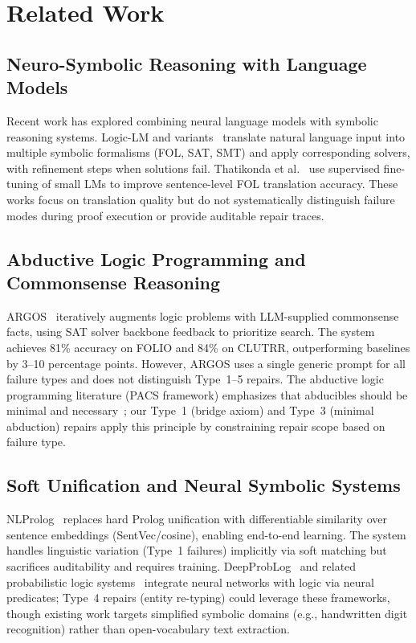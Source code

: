 \documentclass[11pt,letterpaper]{article}
\begin{document}
\section{Related Work}

\subsection{Neuro-Symbolic Reasoning with Language Models}

Recent work has explored combining neural language models with symbolic reasoning systems. Logic-LM and variants~\citep{Pan2023} translate natural language input into multiple symbolic formalisms (FOL, SAT, SMT) and apply corresponding solvers, with refinement steps when solutions fail. Thatikonda et al.~\citep{Thatikonda2026} use supervised fine-tuning of small LMs to improve sentence-level FOL translation accuracy. These works focus on translation quality but do not systematically distinguish failure modes during proof execution or provide auditable repair traces.

\subsection{Abductive Logic Programming and Commonsense Reasoning}

ARGOS~\citep{Cotnareanu2026} iteratively augments logic problems with LLM-supplied commonsense facts, using SAT solver backbone feedback to prioritize search. The system achieves 81\% accuracy on FOLIO and 84\% on CLUTRR, outperforming baselines by 3--10 percentage points. However, ARGOS uses a single generic prompt for all failure types and does not distinguish Type~1--5 repairs. The abductive logic programming literature (PACS framework) emphasizes that abducibles should be minimal and necessary~\citep{Cotnareanu2026}; our Type~1 (bridge axiom) and Type~3 (minimal abduction) repairs apply this principle by constraining repair scope based on failure type.

\subsection{Soft Unification and Neural Symbolic Systems}

NLProlog~\citep{Weber2019} replaces hard Prolog unification with differentiable similarity over sentence embeddings (SentVec/cosine), enabling end-to-end learning. The system handles linguistic variation (Type~1 failures) implicitly via soft matching but sacrifices auditability and requires training. DeepProbLog~\citep{Manhaeve2018} and related probabilistic logic systems~\citep{Raedt2007} integrate neural networks with logic via neural predicates; Type~4 repairs (entity re-typing) could leverage these frameworks, though existing work targets simplified symbolic domains (e.g., handwritten digit recognition) rather than open-vocabulary text extraction.
\end{document}
